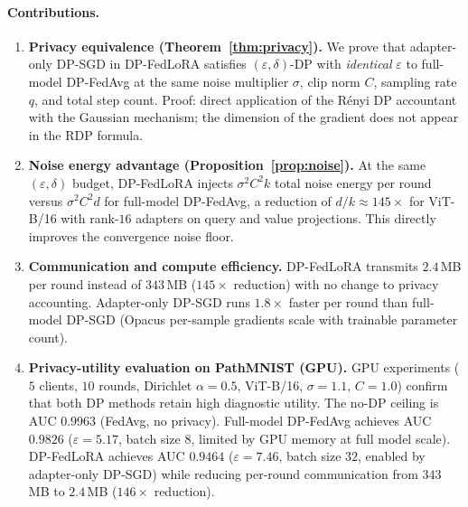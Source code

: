 ﻿\documentclass{article}
\newcommand{\method}{DP-FedLoRA}
\renewcommand{\eps}{\varepsilon}
\newcommand{\noise}{\sigma}
\newcommand{\clip}{C}
\begin{document}
\paragraph{Contributions.}
\begin{enumerate}
  \item \textbf{Privacy equivalence (Theorem~\ref{thm:privacy}).}
    We prove that adapter-only DP-SGD in \method{} satisfies
    $(\eps, \delta)$-DP with \emph{identical} $\eps$ to full-model
    DP-FedAvg at the same noise multiplier $\noise$, clip norm $\clip$,
    sampling rate $q$, and total step count.
    Proof: direct application of the Rényi DP accountant with the Gaussian
    mechanism; the dimension of the gradient does not appear in the
    RDP formula.

  \item \textbf{Noise energy advantage (Proposition~\ref{prop:noise}).}
    At the same $(\eps, \delta)$ budget, \method{} injects
    $\sigma^2 C^2 k$ total noise energy per round versus
    $\sigma^2 C^2 d$ for full-model DP-FedAvg, a reduction of
    $d/k \approx 145{\times}$ for ViT-B/16 with rank-$16$ adapters
    on query and value projections.
    This directly improves the convergence noise floor.

  \item \textbf{Communication and compute efficiency.}
    \method{} transmits $2.4$\,MB per round instead of $343$\,MB
    ($145{\times}$ reduction) with no change to privacy accounting.
    Adapter-only DP-SGD runs $1.8{\times}$ faster per round than
    full-model DP-SGD (Opacus per-sample gradients scale with
    trainable parameter count).

  \item \textbf{Privacy-utility evaluation on PathMNIST (GPU).}
    GPU experiments ($5$ clients, $10$ rounds, Dirichlet $\alpha{=}0.5$,
    ViT-B/16, $\noise{=}1.1$, $\clip{=}1.0$) confirm that both DP methods
    retain high diagnostic utility.
    The no-DP ceiling is AUC $0.9963$ (FedAvg, no privacy).
    Full-model DP-FedAvg achieves AUC $0.9826$ ($\eps{=}5.17$,
    batch size $8$, limited by GPU memory at full model scale).
    \method{} achieves AUC $0.9464$ ($\eps{=}7.46$, batch size $32$,
    enabled by adapter-only DP-SGD) while reducing per-round communication
    from $343$\,MB to $2.4$\,MB ($146{\times}$ reduction).
\end{enumerate}



\end{document}
